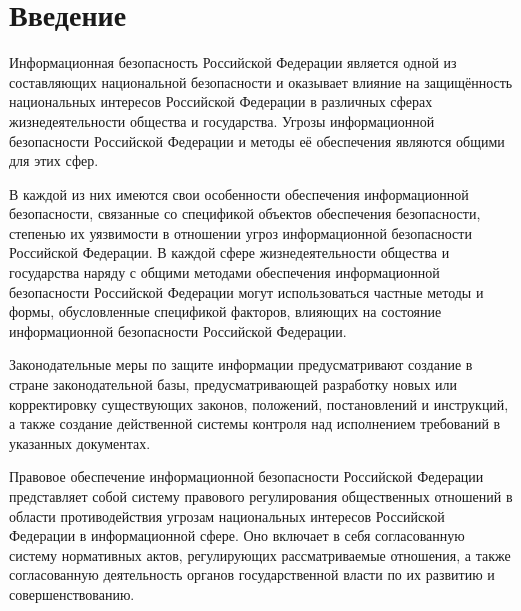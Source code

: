 \section{Введение} \label{rights_introduction}

Информационная безопасность Российской Федерации является одной из составляющих национальной безопасности и оказывает влияние на защищённость национальных интересов Российской Федерации в различных сферах жизнедеятельности общества и государства. Угрозы информационной безопасности Российской Федерации и методы её обеспечения являются общими для этих сфер.

\vspace{\baselineskip}
В каждой из них имеются свои особенности обеспечения информационной безопасности, связанные со спецификой объектов обеспечения безопасности, степенью их уязвимости в отношении угроз информационной безопасности Российской Федерации. В каждой сфере жизнедеятельности общества и государства наряду с общими методами обеспечения информационной безопасности Российской Федерации могут использоваться частные методы и формы, обусловленные спецификой факторов, влияющих на состояние информационной безопасности Российской Федерации.

\vspace{\baselineskip}
Законодательные меры по защите информации предусматривают создание в стране законодательной базы, предусматривающей разработку новых или корректировку существующих законов, положений, постановлений и инструкций, а также создание действенной системы контроля над исполнением требований в указанных документах.

\vspace{\baselineskip}
Правовое обеспечение информационной безопасности Российской Федерации представляет собой систему правового регулирования общественных отношений в области противодействия угрозам национальных интересов Российской Федерации в информационной сфере. 	Оно включает в себя согласованную систему нормативных актов, регулирующих рассматриваемые отношения, а также согласованную деятельность органов государственной власти по их развитию и совершенствованию.